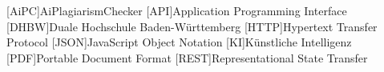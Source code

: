 \addchap*{\langacronyms}
\begin{acronym}
    [AiPC]{AiPlagiarismChecker}
    [API]{Application Programming Interface}
    [DHBW]{Duale Hochschule Ba\-den-\-Würt\-tem\-berg}
    [HTTP]{Hypertext Transfer Protocol}
    [JSON]{JavaScript Object Notation}
    [KI]{Künstliche Intelligenz}
    [PDF]{Portable Document Format}
    [REST]{Representational State Transfer}
\end{acronym}
